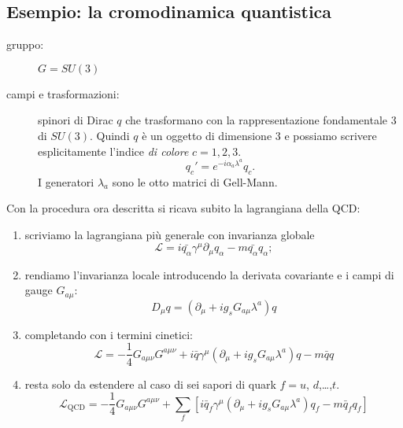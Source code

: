 \documentclass[italian,a4paper]{article}
\theoremstyle{definition}
\newcommand{\lagr}{\ensuremath{\mathscr{L}}}
\newcommand{\dimu}{\ensuremath{\partial_{\mu}}}
\newcommand{\Dimu}{\ensuremath{D_{\mu}}}
\begin{document}
\subsection{Esempio: la cromodinamica quantistica}\label{qcd}
\begin{description}
    \item[gruppo:] $G = SU(3)$
    \item[campi e trasformazioni:] spinori di Dirac $q$ che trasformano con la
        rappresentazione fondamentale $3$ di $SU(3)$. Quindi $q$ \`e un
        oggetto di dimensione $3$ e possiamo scrivere esplicitamente
        l'indice \emph{di colore} $c = 1, 2, 3$. 
        \begin{equation*}
            q_c' = e^{-i \alpha_a \lambda^a}q_c.
        \end{equation*} I generatori $\lambda_a$ sono le otto matrici di
        Gell-Mann.
\end{description}
Con la procedura ora descritta si ricava subito la lagrangiana della QCD:
\begin{enumerate}
    \item scriviamo la lagrangiana pi\`u generale con invarianza globale
        \begin{equation*}
            \lagr = i \bar{q_\alpha}\gamma^\mu\dimu q_\alpha - m
            \bar{q_\alpha}q_\alpha;
        \end{equation*}
    \item rendiamo l'invarianza locale introducendo la derivata covariante e
        i campi di gauge $G_{a\mu}$:
        \begin{equation*}
            \Dimu q = (\dimu + i g_s G_{a\mu}\lambda^a)q
        \end{equation*}
\item completando con i termini cinetici:
    \begin{equation*}
        \lagr = - \dfrac{1}{4}G_{a\mu\nu}G^{a\mu\nu} + i \bar q
        \gamma^\mu(\dimu + i g_s G_{a\mu}\lambda^a)q - m \bar q q
    \end{equation*}
\item resta solo da estendere al caso di sei sapori di quark $f = u$,
    $d$,\dots,$t$.
    \begin{equation*}
        \lagr_{\text{QCD}} = - \dfrac{1}{4}G_{a\mu\nu}G^{a\mu\nu} + \sum_f[i
        \bar q_f
        \gamma^\mu(\dimu + i g_s G_{a\mu}\lambda^a)q_f - m \bar q_f q_f]         
    \end{equation*}
\end{enumerate}
\end{document}

